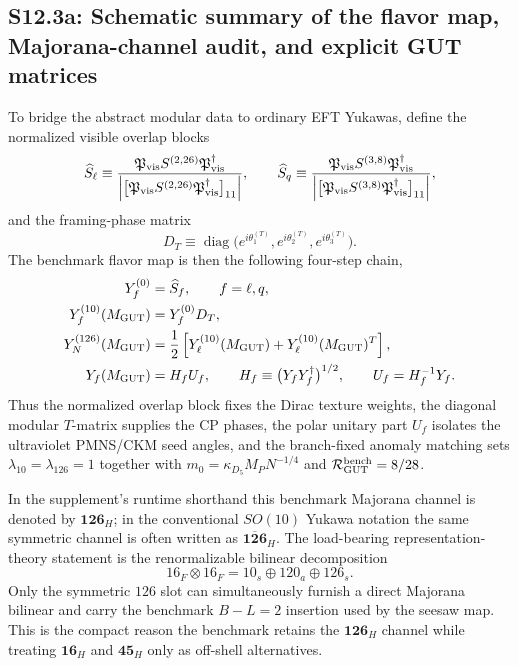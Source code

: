 \documentclass[11pt]{article}
\begin{document}
\subsection*{S12.3a: Schematic summary of the flavor map, Majorana-channel audit, and explicit GUT matrices}

To bridge the abstract modular data to ordinary EFT Yukawas, define the normalized visible overlap blocks
\begin{equation}
 \widehat S_{\ell}
 \equiv
 \frac{\mathfrak P_{\rm vis}S^{(2,26)}\mathfrak P_{\rm vis}^{\dagger}}{\left|\bigl[\mathfrak P_{\rm vis}S^{(2,26)}\mathfrak P_{\rm vis}^{\dagger}\bigr]_{11}\right|},
 \qquad
 \widehat S_q
 \equiv
 \frac{\mathfrak P_{\rm vis}S^{(3,8)}\mathfrak P_{\rm vis}^{\dagger}}{\left|\bigl[\mathfrak P_{\rm vis}S^{(3,8)}\mathfrak P_{\rm vis}^{\dagger}\bigr]_{11}\right|},
\end{equation}
and the framing-phase matrix
\begin{equation}
 D_T\equiv\operatorname{diag}\!\bigl(e^{i\theta_1^{(T)}},e^{i\theta_2^{(T)}},e^{i\theta_3^{(T)}}\bigr).
\end{equation}
The benchmark flavor map is then the following four-step chain,
\begin{align}
 Y_f^{(0)}&=\widehat S_f, \qquad f=\ell,q,
 \notag\\
 Y_f^{(10)}(M_{\rm GUT})&=Y_f^{(0)}D_T,
 \notag\\
 Y_N^{(126)}(M_{\rm GUT})&=\frac12\left[Y_{\ell}^{(10)}(M_{\rm GUT})+Y_{\ell}^{(10)}(M_{\rm GUT})^T\right],
 \notag\\
 Y_f(M_{\rm GUT})&=H_fU_f,
 \qquad
 H_f\equiv\bigl(Y_fY_f^{\dagger}\bigr)^{1/2},
 \qquad
 U_f=H_f^{-1}Y_f.
\end{align}
Thus the normalized overlap block fixes the Dirac texture weights, the diagonal modular $T$-matrix supplies the CP phases, the polar unitary part $U_f$ isolates the ultraviolet PMNS/CKM seed angles, and the branch-fixed anomaly matching sets $\lambda_{10}=\lambda_{126}=1$ together with $m_0=\kappa_{D_5}M_PN^{-1/4}$ and $\mathcal R_{\rm GUT}^{\rm bench}=8/28$.

In the supplement's runtime shorthand this benchmark Majorana channel is denoted by $\mathbf{126}_H$; in the conventional $SO(10)$ Yukawa notation the same symmetric channel is often written as $\overline{\mathbf{126}}_H$. The load-bearing representation-theory statement is the renormalizable bilinear decomposition
\begin{equation}
 16_F\otimes 16_F = 10_s\oplus 120_a\oplus 126_s.
\end{equation}
Only the symmetric $126$ slot can simultaneously furnish a direct Majorana bilinear and carry the benchmark $B-L=2$ insertion used by the seesaw map. This is the compact reason the benchmark retains the $\mathbf{126}_H$ channel while treating $\mathbf{16}_H$ and $\mathbf{45}_H$ only as off-shell alternatives.
\end{document}
